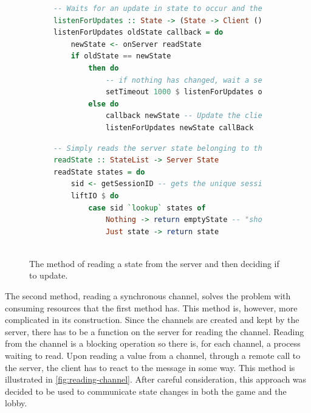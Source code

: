 \documentclass[a4paper]{article}
\begin{document}
\begin{figure}[ht!]

\begin{subfigure}[]{\textwidth}
\begin{lstlisting}[language=Haskell]
-- Waits for an update in state to occur and then updates if it has
listenForUpdates :: State -> (State -> Client ()) -> Client ()
listenForUpdates oldState callback = do
    newState <- onServer readState
    if oldState == newState 
        then do
            -- if nothing has changed, wait a second before checking again
            setTimeout 1000 $ listenForUpdates oldState callback
        else do
            callback newState -- Update the client in some way
            listenForUpdates newState callBack
\end{lstlisting}
\end{subfigure}

\begin{subfigure}[]{\textwidth}
\begin{lstlisting}[language=Haskell]
-- Simply reads the server state belonging to that client
readState :: StateList -> Server State
readState states = do
    sid <- getSessionID -- gets the unique session id
    liftIO $ do
        case sid `lookup` states of
            Nothing -> return emptyState -- "should not happen"
            Just state -> return state
    
\end{lstlisting}
\end{subfigure}
\caption{The method of reading a state from the server and then deciding if to update.}
\label{fig:reading-state}
\end{figure}
The second method, reading a synchronous channel, solves the problem with consuming resources that the first method has. This method is, however, more complicated in its construction. Since the channels are created and kept by the server, there has to be a function on the server for reading the channel. Reading from the channel is a blocking operation so there is, for each channel, a process waiting to read. Upon reading a value from a channel, through a remote call to the server, the client has to react to the message in some way. This method is illustrated in \cref{fig:reading-channel}. After careful consideration, this approach was decided to be used to communicate state changes in both the game and the lobby.
\end{document}
